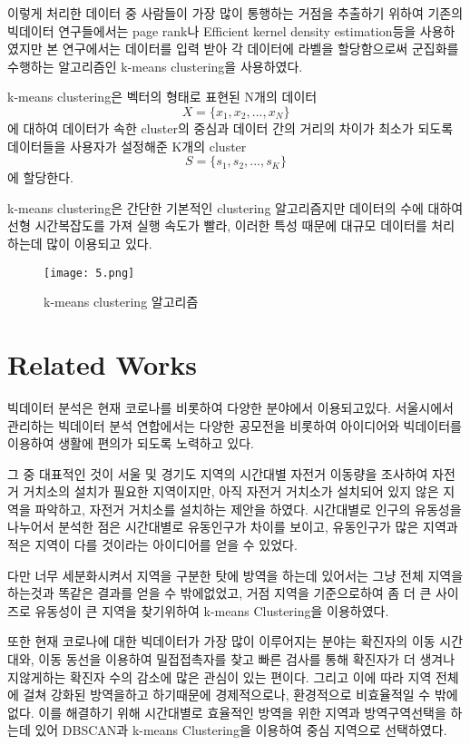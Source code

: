 \documentclass[10pt,journal,compsoc]{IEEEtran}
\begin{document}
이렇게 처리한 데이터 중 사람들이 가장 많이 통행하는 거점을 추출하기 위하여 기존의 빅데이터 연구들에서는 page rank나 Efficient kernel density estimation등을 사용하였지만 본 연구에서는 데이터를 입력 받아 각 데이터에 라벨을 할당함으로써 군집화를 수행하는 알고리즘인 k-means clustering을 사용하였다.

k-means clustering은 벡터의 형태로 표현된 N개의 데이터 $$X=\{x_1,x_2,...,x_N\}$$ 에 대하여 데이터가 속한 cluster의 중심과 데이터 간의 거리의 차이가 최소가 되도록 데이터들을 사용자가 설정해준 K개의 cluster $$S=\{s_1,s_2,...,s_K\}$$에 할당한다.

k-means clustering은 간단한 기본적인 clustering 알고리즘지만 데이터의 수에 대하여 선형 시간복잡도를 가져 실행 속도가 빨라, 이러한 특성 때문에 대규모 데이터를 처리하는데 많이 이용되고 있다.

\begin{figure}[htp] 
    \centering
    \texttt{[image: 5.png]} 
    \caption{k-means clustering 알고리즘} 
    \label{fig:3} 
\end{figure}

\section{Related Works}
빅데이터 분석은 현재 코로나를 비롯하여 다양한 분야에서 이용되고있다. 서울시에서 관리하는 빅데이터 분석 연합에서는 다양한 공모전을 비롯하여 아이디어와 빅데이터를 이용하여 생활에 편의가 되도록 노력하고 있다.

그 중 대표적인 것이 서울 및 경기도 지역의 시간대별 자전거 이동량을 조사하여 자전거 거치소의 설치가 필요한 지역이지만, 아직 자전거 거치소가 설치되어 있지 않은 지역을 파악하고, 자전거 거치소를 설치하는 제안을 하였다. 시간대별로 인구의 유동성을 나누어서 분석한 점은 시간대별로 유동인구가 차이를 보이고, 유동인구가 많은 지역과 적은 지역이 다를 것이라는 아이디어를 얻을 수 있었다.

다만 너무 세분화시켜서 지역을 구분한 탓에 방역을 하는데 있어서는 그냥 전체 지역을 하는것과 똑같은 결과를 얻을 수 밖에없었고, 
거점 지역을 기준으로하여 좀 더 큰 사이즈로 유동성이 큰 지역을 찾기위하여 k-means Clustering을 이용하였다.

또한 현재 코로나에 대한 빅데이터가 가장 많이 이루어지는 분야는 확진자의 이동 시간대와, 이동 동선을 이용하여 밀접접촉자를 찾고 빠른 검사를 통해 확진자가 더 생겨나지않게하는 확진자 수의 감소에 많은 관심이 있는 편이다. 그리고 이에 따라 지역 전체에 걸쳐 강화된 방역을하고 하기때문에 경제적으로나, 환경적으로 비효율적일 수 밖에없다. 이를 해결하기 위해 시간대별로 효율적인 방역을 위한 지역과 방역구역선택을 하는데 있어 DBSCAN과 k-means Clustering을 이용하여 중심 지역으로 선택하였다.
\end{document}
